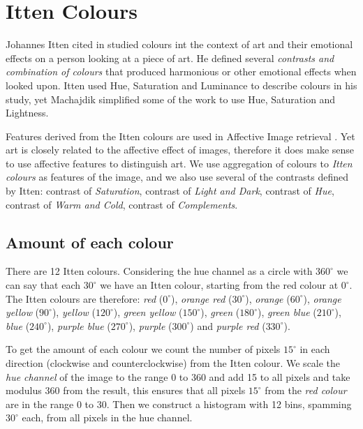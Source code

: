 \documentclass[11pt,a4paper,twoside,openright]{report}
\begin{document}
\section{Itten Colours}

Johannes Itten cited in \cite{mach10clas} studied colours int the context of
art and their emotional effects on a person looking at a piece of art.  He
defined several \emph{contrasts and combination of colours} that produced
harmonious or other emotional effects when looked upon.  Itten used Hue,
Saturation and Luminance to describe colours in his study, yet Machajdik
\cite{mach10clas} simplified some of the work to use Hue, Saturation and
Lightness.

Features derived from the Itten colours are used in Affective Image retrieval
\cite{mach10clas}.  Yet art is closely related to the affective effect of
images, therefore it does make sense to use affective features to distinguish
art.  We use aggregation of colours to \emph{Itten colours} as features of the
image, and we also use several of the contrasts defined by Itten: contrast of
\emph{Saturation}, contrast of \emph{Light and Dark}, contrast of \emph{Hue},
contrast of \emph{Warm and Cold}, contrast of \emph{Complements}.

\subsection{Amount of each colour}

There are 12 Itten colours.  Considering the hue channel as a circle
with $360^{\circ}$ we can say that each $30^{\circ}$ we have an Itten colour,
starting from the red colour at $0^{\circ}$.  The Itten colours are therefore:
\emph{red}    ($0^{\circ}$),   \emph{orange red}    ($30^{\circ}$),
\emph{orange} ($60^{\circ}$),  \emph{orange yellow} ($90^{\circ}$),
\emph{yellow} ($120^{\circ}$), \emph{green yellow}  ($150^{\circ}$),
\emph{green}  ($180^{\circ}$), \emph{green blue}    ($210^{\circ}$),
\emph{blue}   ($240^{\circ}$), \emph{purple blue}   ($270^{\circ}$),
\emph{purple} ($300^{\circ}$) and \emph{purple red} ($330^{\circ}$).

To get the amount of each colour we count the number of pixels $15^{\circ}$ in
each direction (clockwise and counterclockwise) from the Itten colour.  We
scale the \emph{hue channel} of the image to the range 0 to 360 and add 15 to
all pixels and take modulus 360 from the result, this ensures that all pixels
$15^{\circ}$ from the \emph{red colour} are in the range 0 to 30.  Then we
construct a histogram with 12 bins, spamming $30^{\circ}$ each, from all pixels
in the hue channel.
\end{document}
